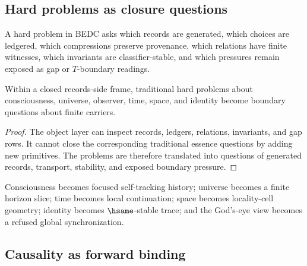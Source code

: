 \subsection{Hard problems as closure questions}
\label{subsec:philosophy-hard-problems-closure-questions}

\begin{definition}
\label{def:philosophy-hard-problem-form}
A hard problem in BEDC asks which records are generated, which choices
are ledgered, which compressions preserve provenance, which relations
have finite witnesses, which invariants are classifier-stable, and
which pressures remain exposed as gap or \(T\)-boundary readings.
\end{definition}

\begin{theorem}
\label{thm:philosophy-hard-problems-closure-questions}
Within a closed records-side frame, traditional hard problems about
consciousness, universe, observer, time, space, and identity become
boundary questions about finite carriers.
\end{theorem}
\begin{proof}
The object layer can inspect records, ledgers, relations, invariants,
and gap rows. It cannot close the corresponding traditional essence
questions by adding new primitives. The problems are therefore
translated into questions of generated records, transport, stability,
and exposed boundary pressure.
\end{proof}

\begin{corollary}
\label{cor:philosophy-traditional-questions-records-rewrites}
Consciousness becomes focused self-tracking history; universe becomes a
finite horizon slice; time becomes local continuation; space becomes
locality-cell geometry; identity becomes \(\hsame\)-stable trace; and
the God's-eye view becomes a refused global synchronization.
\end{corollary}

\subsection{Causality as forward binding}
\label{subsec:philosophy-causality-forward-binding}

